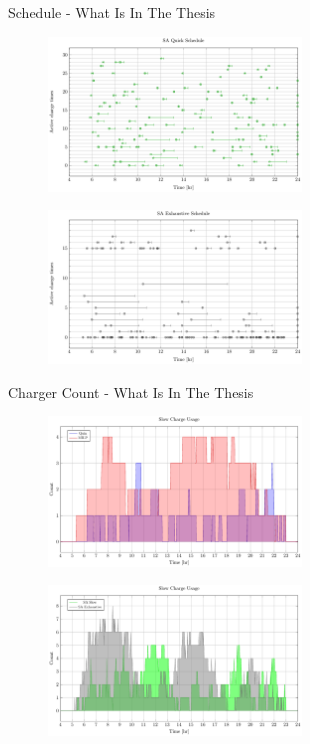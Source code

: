 \documentclass[bigger]{beamer}
\begin{document}
\begin{frame}[label={sec:org63c0046}]{Schedule - What Is In The Thesis}
\begin{figure}[htpb]
\centering
    \includegraphics[width=0.6\textwidth]{img/sa-pap-paper-bad/schedule-sa-quick}
\end{figure}
\begin{figure}[htpb]
\centering
    \includegraphics[width=0.6\textwidth]{img/sa-pap-paper-bad/schedule-sa-heuristic}
\end{figure}
\end{frame}

\begin{frame}[label={sec:org28f1c4f}]{Charger Count - What Is In The Thesis}
\begin{figure}[htpb]
\centering
    \includegraphics[width=0.6\textwidth]{img/sa-pap-paper-bad/charger-count-slow-milp-qin}
\end{figure}
\begin{figure}[htpb]
\centering
    \includegraphics[width=0.6\textwidth]{img/sa-pap-paper-bad/charger-count-slow-sa}
\end{figure}
\end{frame}
\end{document}
